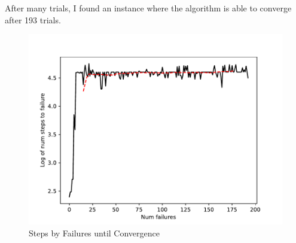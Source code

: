 \begin{answer}
After many trials, I found an instance where the algorithm is able to converge after 193 trials. 
\begin{figure}[here] %
   \centering
   \includegraphics[width=6in]{control6.pdf} 
   \caption{Steps by Failures until Convergence}
   \label{fig:example}
\end{figure}
\end{answer}
